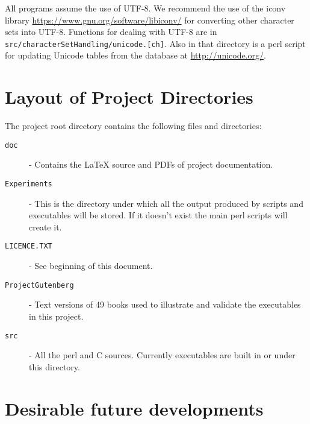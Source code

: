 \documentclass{article}
\begin{document}
All programs assume the use of UTF-8.  We recommend the use of the
iconv library \url{https://www.gnu.org/software/libiconv/} for
converting other character sets into UTF-8.  Functions for dealing
with UTF-8 are in \texttt{src/characterSetHandling/unicode.[ch]}.
Also in that directory is a perl script for updating Unicode tables
from the database at \url{http://unicode.org/}.


\section{Layout of Project Directories}

The project root directory contains the following files and directories:

\begin{description}
  \item[\texttt{doc}] - Contains the LaTeX source and PDFs of project documentation.
  \item[\texttt{Experiments}] - This is the directory under which all
    the output produced by scripts and executables will be stored.  If
    it doesn't exist the main perl scripts will create it.
\item[\texttt{LICENCE.TXT}] - See beginning of this document.
  \item[\texttt{ProjectGutenberg}] - Text versions of 49 books used to
    illustrate and validate the executables in this project.
  \item[\texttt{src}] - All the perl and C sources.  Currently
    executables are built in or under this directory.
\end{description}

\section{Desirable future developments}
\end{document}

